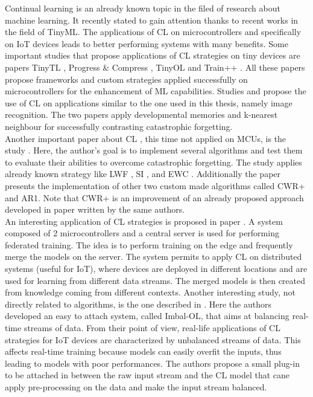 \documentclass[12pt]{report}
\begin{document}
Continual learning is an already known topic in the filed of research about machine learning. It recently stated to gain attention thanks to recent works in the field of TinyML. The applications of CL on microcontrollers and specifically on IoT devices leads to better performing systems with many benefits. Some important studies that propose applications of CL strategies on tiny devices are papers TinyTL \cite{cai2020tinytl}, Progress \& Compress \cite{schwarz2018progress}, TinyOL \cite{ren2021tinyol} and Train++ \cite{sudharsan2021train++}. All these papers propose frameworks and custom strategies applied successfully on microcontrollers for the enhancement of ML capabilities. 
Studies \cite{park2020convolutional} and \cite{disabato2020incremental} propose the use of CL on applications similar to the one used in this thesis, namely image recognition. The two papers apply developmental memories and k-nearest neighbour for successfully contrasting catastrophic forgetting. \\
Another important paper about CL , this time not applied on MCUs, is the study \cite{maltoni2019continuous}. Here, the author's goal is to implement several algorithms and test them to evaluate their abilities to overcome catastrophic forgetting. The study applies already known strategy like LWF \cite{li2017learning}, SI \cite{zenke2017continual}, and EWC \cite{kirkpatrick2017overcoming}. Additionally the paper presents the implementation of other two custom made algorithms called CWR+ and AR1. Note that CWR+ is an improvement of an already proposed approach developed in paper \cite{lomonaco2017core50} written by the same authors. \\
An interesting application of CL strategies is proposed in paper \cite{grau2021device}. A system composed of 2 microcontrollers and a central server is used for performing federated training. The idea is to perform training on the edge and frequently merge the models on the server. The system permits to apply CL on distributed systems (useful for IoT), where devices are deployed in different locations and are used for learning from different data streams. The merged models is then created from knowledge coming from different contexts.
Another interesting study, not directly related to algorithms, is the one described in \cite{sudharsan2021imbal}. Here the authors developed an easy to attach system, called Imbal-OL, that aims at balancing real-time streams of data. From their point of view, real-life applications of CL strategies for IoT devices are characterized by unbalanced streams of data. This affects real-time training because models can easily overfit the inputs, thus leading to models with poor performances. The authors propose a small plug-in to be attached in between the raw input stream and the CL model that cane apply pre-processing on the data and make the input stream balanced. \\
\end{document}
